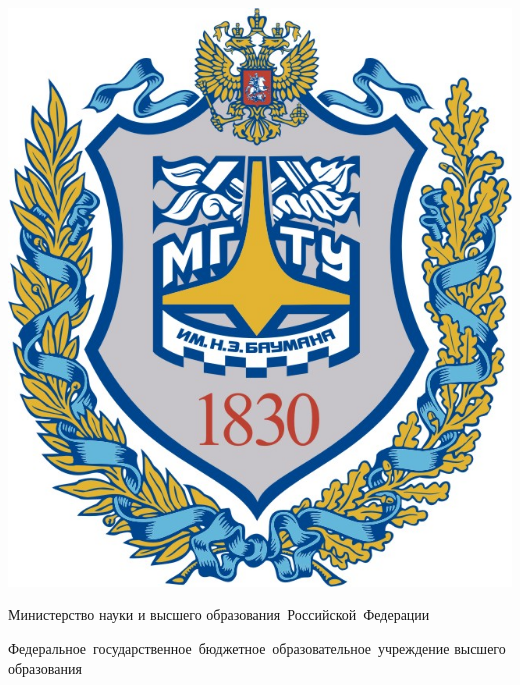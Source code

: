 \begin{titlepage}
    \fontsize{12pt}{12pt}\selectfont

    \noindent
    \begin{center}
            \begin{minipage}{0.12\textwidth}
                \includegraphics[width=\linewidth]{img/bmstu_logo.jpg}
            \end{minipage}
            \hfill
            \begin{minipage}{0.85\textwidth}\centering\bfseries
                {
                    \linespread{1}\selectfont
                    \vspace{0.1cm}
                    {Министерство науки и высшего образования~Российской~Федерации}

                    {Федеральное~государственное~бюджетное~образовательное~учреждение высшего образования}

}
\end{minipage}
\end{center}
\end{titlepage}
